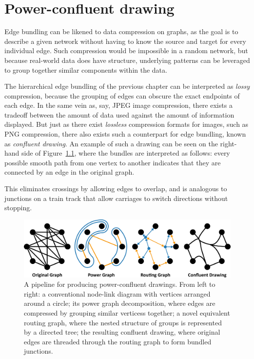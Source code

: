\chapter{Power-confluent drawing}
\label{chap:power}
Edge bundling can be likened to data compression on graphs, as the goal is to describe a given network without having to know the source and target for every individual edge.
Such compression would be impossible in a random network, but because real-world data does have structure, underlying patterns can be leveraged to group together similar components within the data.

The hierarchical edge bundling of the previous chapter can be interpreted as \emph{lossy} compression, because the grouping of edges can obscure the exact endpoints of each edge. In the same vein as, say, JPEG image compression, there exists a tradeoff between the amount of data used against the amount of information displayed.
But just as there exist \emph{lossless} compression formats for images, such as PNG compression, there also exists such a counterpart for edge bundling, known as \emph{confluent drawing}. An example of such a drawing can be seen on the right-hand side of Figure~\ref{fig:power_teaser}, where the bundles are interpreted as follows: every possible smooth path from one vertex to another indicates that they are connected by an edge in the original graph.

This eliminates crossings by allowing edges to overlap, and is analogous to junctions on a train track that allow carriages to switch directions without stopping.

\begin{figure}
  \centering
  \includegraphics[width=\textwidth]{power/teaser.pdf}
  \caption[A power-confluent drawing pipeline]{A pipeline for producing power-confluent drawings. 
  From left to right: a conventional node-link diagram with vertices arranged around a circle; its power graph decomposition, where edges are compressed by grouping similar verticess together; a novel equivalent routing graph, where the nested structure of groups is represented by a directed tree; the resulting confluent drawing, where original edges are threaded through the routing graph to form bundled junctions.}
  \label{fig:power_teaser}
\end{figure}

